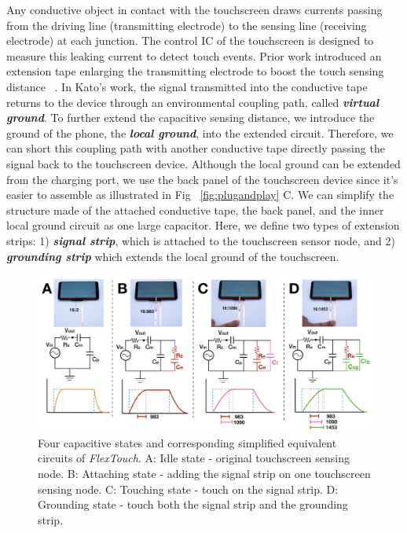 Any conductive object in contact with the touchscreen draws currents passing from the driving line (transmitting electrode) to the sensing line (receiving electrode) at each junction. The control IC of the touchscreen is designed to measure this leaking current to detect touch events. Prior work introduced an extension tape enlarging the transmitting electrode to boost the touch sensing distance ~\cite{Kato2015, Kato2015a,mobicom-gao18, Ikematsu-Ohmic-Touch}. In Kato's work, the signal transmitted into the conductive tape returns to the device through an environmental coupling path, called \textbf{\textit{virtual ground}}. To further extend the capacitive sensing distance, we introduce the ground of the phone, the \textbf{\textit{local ground}}, into the extended circuit. Therefore, we can short this coupling path with another conductive tape directly passing the signal back to the touchscreen device. Although the local ground can be extended from the charging port, we use the back panel of the touchscreen device since it's easier to assemble as illustrated in Fig ~\ref{fig:plugandplay} C. We can simplify the structure made of the attached conductive tape, the back panel, and the inner local ground circuit as one large capacitor. Here, we define two types of extension strips: 1) \textbf{\textit{signal strip}}, which is attached to the touchscreen sensor node, and 2) \textbf{\textit{grounding strip}} which extends the local ground of the touchscreen.

\begin{figure}[ht]
\centering
    \includegraphics[width=0.95\columnwidth]{figures/flextouch-principle-circuit.png}
    \setlength{\belowcaptionskip}{-6pt}
    \caption{Four capacitive states and corresponding simplified equivalent circuits of \textit{FlexTouch}. A: Idle state - original touchscreen sensing node. B: Attaching state - adding the signal strip on one touchscreen sensing node. C: Touching state - touch on the signal strip. D: Grounding state - touch both the signal strip and the grounding strip.}
    \label{fig:flextouch-principle-circuit}
\end{figure}

